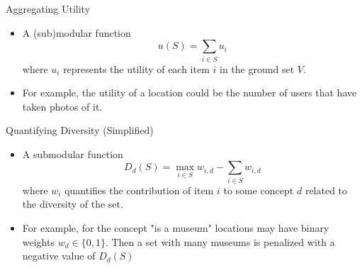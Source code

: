 \documentclass{beamer}
\begin{document}
\begin{frame}{Aggregating Utility}
  \begin{itemize}
    \item A (sub)modular function
      \begin{equation*}
        u(S) = \sum_{i \in S}u_{i}
      \end{equation*}
    where $u_{i}$ represents the utility of each item $i$ in the ground set $V$.
    \item For example, the utility of a location could be the number of users that have taken photos of it.
  \end{itemize}
\end{frame}

\begin{frame}{Quantifying Diversity (Simplified)}
  \begin{itemize}
    \item A submodular function
      \begin{equation*}
        D_{d}(S) = \max_{i \in S}w_{i,d} - \sum_{i \in S}w_{i,d}
      \end{equation*}
    where $w_{i}$ quantifies the contribution of item $i$ to some concept $d$ related to the diversity of the set.
    \item For example, for the concept "is a museum" locations may have binary weights $w_{d} \in \{0,1\}$. Then a set with many museums is penalized with a negative value of $D_{d}(S)$
  \end{itemize}
\end{frame}
\end{document}
